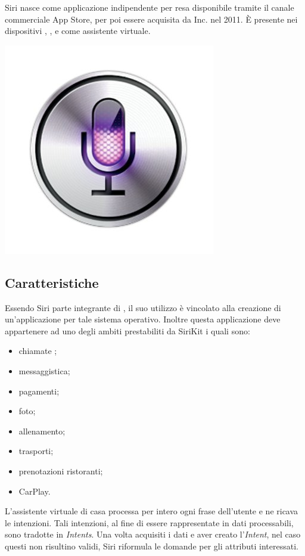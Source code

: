 \documentclass[a4paper,titlepage]{article}
\begin{document}
	\begin{minipage}{0.7\textwidth}\raggedright
		Siri nasce come applicazione indipendente per  resa disponibile tramite il canale commerciale App Store, per poi essere acquisita da  Inc. nel 2011. È presente nei dispositivi , ,  e  come assistente virtuale.
	\end{minipage}
	\hfill
	\noindent\begin{minipage}{0.1\textwidth}
		\includegraphics[scale=0.3]{images/siri.jpg}
	\end{minipage}
	\subsection{Caratteristiche}
		Essendo Siri parte integrante di , il suo utilizzo è vincolato alla creazione di un'applicazione per tale sistema operativo. Inoltre questa applicazione deve appartenere ad uno degli ambiti prestabiliti da SiriKit i quali sono:
			\begin{itemize}
				\item chiamate ;
				\item messaggistica;
				\item pagamenti;
				\item foto;
				\item allenamento;
				\item trasporti;
				\item prenotazioni ristoranti;
				\item CarPlay.
			\end{itemize}
		L'assistente virtuale di casa  processa per intero ogni frase dell'utente e ne ricava le intenzioni. Tali intenzioni, al fine di essere rappresentate in dati processabili, sono tradotte in \textit{Intents}. Una volta acquisiti i dati e aver creato l'\textit{Intent}, nel caso questi non risultino validi, Siri riformula le domande per gli attributi interessati.
\newpage
\end{document}
